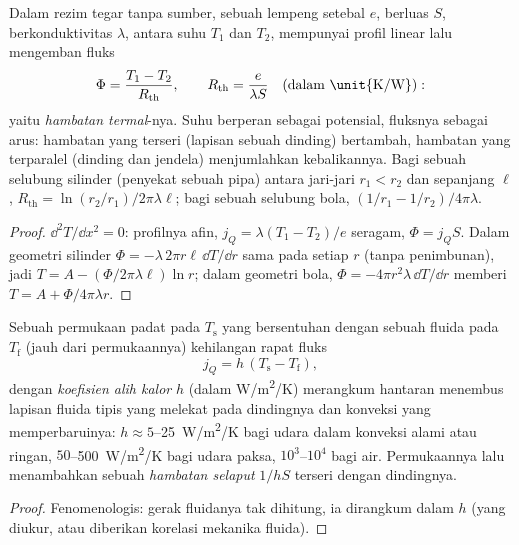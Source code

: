 \begin{proposition}\label{prop:b2:heat-conduction:resistance}
Dalam rezim tegar tanpa sumber, sebuah lempeng setebal $e$,
berluas $S$, berkonduktivitas $\lambda$, antara suhu $T_1$ dan
$T_2$, mempunyai profil linear lalu mengemban fluks
\[
\Phi = \frac{T_1 - T_2}{R_{\text{th}}}, \qquad
R_{\text{th}} = \frac{e}{\lambda S}\quad\text{(dalam \unit{K/W})} :
\]
yaitu \emph{hambatan termal}-nya. Suhu
berperan sebagai potensial, fluksnya sebagai arus: hambatan yang
terseri (lapisan sebuah dinding) bertambah, hambatan yang terparalel (dinding dan
jendela) menjumlahkan kebalikannya. Bagi sebuah selubung silinder (penyekat
sebuah pipa) antara jari-jari $r_1 < r_2$ dan sepanjang $\ell$,
$R_{\text{th}} = \ln(r_2/r_1)/2\pi\lambda\ell$; bagi sebuah selubung bola,
$(1/r_1 - 1/r_2)/4\pi\lambda$.
\end{proposition}

\begin{proof}
$\dd^2T/\dd x^2 = 0$: profilnya afin, $j_Q = \lambda(T_1 - T_2)/e$
seragam, $\Phi = j_QS$. Dalam geometri silinder $\Phi = -\lambda\,2\pi
r\ell\,\dd T/\dd r$ sama pada setiap $r$ (tanpa penimbunan), jadi
$T = A - (\Phi/2\pi\lambda\ell)\ln r$; dalam geometri bola, $\Phi =
-4\pi r^2\lambda\,\dd T/\dd r$ memberi $T = A + \Phi/4\pi\lambda r$.
\end{proof}

\begin{proposition}\label{prop:b2:heat-conduction:newton}
Sebuah permukaan padat pada $T_{\text{s}}$ yang bersentuhan dengan sebuah fluida pada $T_{\text{f}}$
(jauh dari permukaannya) kehilangan rapat fluks
\[
j_Q = h\,(T_{\text{s}} - T_{\text{f}}) ,
\]
dengan \emph{koefisien alih kalor} $h$ (dalam \unit{W/m^2/K}) merangkum hantaran menembus
lapisan fluida tipis yang melekat pada dindingnya dan konveksi yang
memperbaruinya: $h \approx 5$--\qty{25}{W/m^2/K} bagi udara dalam konveksi alami atau
ringan, $50$--\qty{500}{W/m^2/K} bagi udara paksa, $10^3$--$10^4$
bagi air. Permukaannya lalu menambahkan sebuah \emph{hambatan selaput} $1/hS$
terseri dengan dindingnya.
\end{proposition}

\begin{proof}
Fenomenologis: gerak fluidanya tak dihitung, ia dirangkum
dalam $h$ (yang diukur, atau diberikan korelasi mekanika fluida).
\end{proof}

